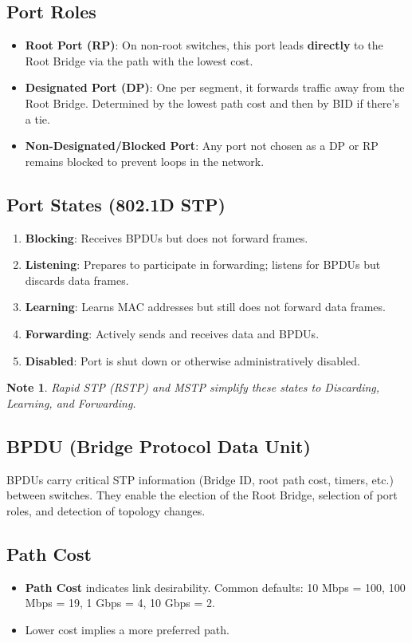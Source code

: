 \documentclass[a4paper]{report}
\newtheorem*{noteenv}{Note}
\begin{document}
\subsection{Port Roles}
\begin{itemize}
  \item \textbf{Root Port (RP)}: On non-root switches, this port leads \textbf{directly} to the Root Bridge via the path with the lowest cost.
  \item \textbf{Designated Port (DP)}: One per segment, it forwards traffic away from the Root Bridge. Determined by the lowest path cost and then by BID if there’s a tie.
  \item \textbf{Non-Designated/Blocked Port}: Any port not chosen as a DP or RP remains blocked to prevent loops in the network.
\end{itemize}

\subsection{Port States (802.1D STP)}
\begin{enumerate}
  \item \textbf{Blocking}: Receives BPDUs but does not forward frames.
  \item \textbf{Listening}: Prepares to participate in forwarding; listens for BPDUs but discards data frames.
  \item \textbf{Learning}: Learns MAC addresses but still does not forward data frames.
  \item \textbf{Forwarding}: Actively sends and receives data and BPDUs.
  \item \textbf{Disabled}: Port is shut down or otherwise administratively disabled.
\end{enumerate}
\begin{noteenv}
Rapid STP (RSTP) and MSTP simplify these states to Discarding, Learning, and Forwarding.
\end{noteenv}

\subsection{BPDU (Bridge Protocol Data Unit)}
BPDUs carry critical STP information (Bridge ID, root path cost, timers, etc.) between switches. They enable the election of the Root Bridge, selection of port roles, and detection of topology changes.

\subsection{Path Cost}
\begin{itemize}
  \item \textbf{Path Cost} indicates link desirability. Common defaults: 10 Mbps = 100, 100 Mbps = 19, 1 Gbps = 4, 10 Gbps = 2.
  \item Lower cost implies a more preferred path.
\end{itemize}
\end{document}
